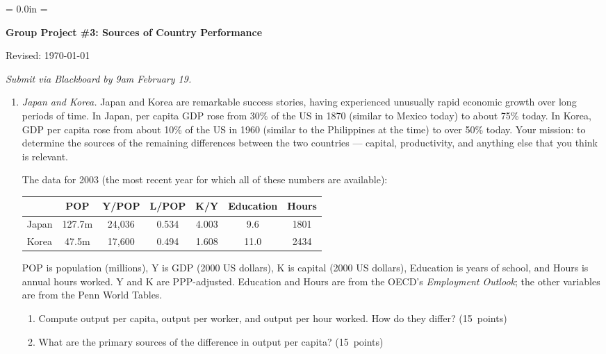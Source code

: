\documentclass[letterpaper,12pt]{article}
\def\HeadName{Group Project \#3}
\begin{document}
\parindent = 0.0in
\parskip = \bigskipamount
\thispagestyle{empty}%
\Head

\centerline{\large \bf \HeadName:  Sources of Country Performance}%
\centerline{Revised:  \today}

\medskip
{\it Submit via Blackboard by 9am February 19.}


\begin{enumerate}

\item {\it Japan and Korea. }   
Japan and Korea are remarkable success stories, 
having experienced unusually rapid economic growth over long periods of time.
In Japan, per capita GDP rose from 30\% of the US in 1870 
(similar to Mexico today) to about 75\% today.  
In Korea, GDP per capita rose from about 10\% of the US in 1960 
(similar to the Philippines at the time) 
to over 50\% today.
Your mission:  to determine the sources of the remaining differences
between the two countries --- capital, productivity, and anything else 
that you think is relevant.  

The data for 2003 
(the most recent year for which all of these numbers are available):
\begin{center}
\begin{tabular}{lcccccc}
\hline\hline
        &  POP  &  Y/POP  &  L/POP  &  K/Y     &  Education &  Hours \\
\hline\hline
Japan   & 127.7m &  24,036 &  0.534 & 4.003     & \phantom{1}9.6 & 1801 \\%
Korea   &  \phantom{1}47.5m 
                 &  17,600 &  0.494 & 1.608    & 11.0  &  2434  \\%
\hline\hline
\end{tabular}
\end{center}
POP is population (millions), Y is GDP (2000 US dollars), 
K is capital (2000 US dollars), Education is years of school, 
and Hours is annual hours worked.  
Y and K are PPP-adjusted.  
Education and Hours are from the OECD's {\it Employment Outlook\/};
the other variables are from the Penn World Tables.  

\begin{enumerate}
\item Compute output per capita, output per worker, and output per
hour worked.  How do they differ? (15~points)

\item What are the primary sources of the difference in output per
capita? (15~points)


\end{enumerate}
\end{enumerate}
\end{document}
